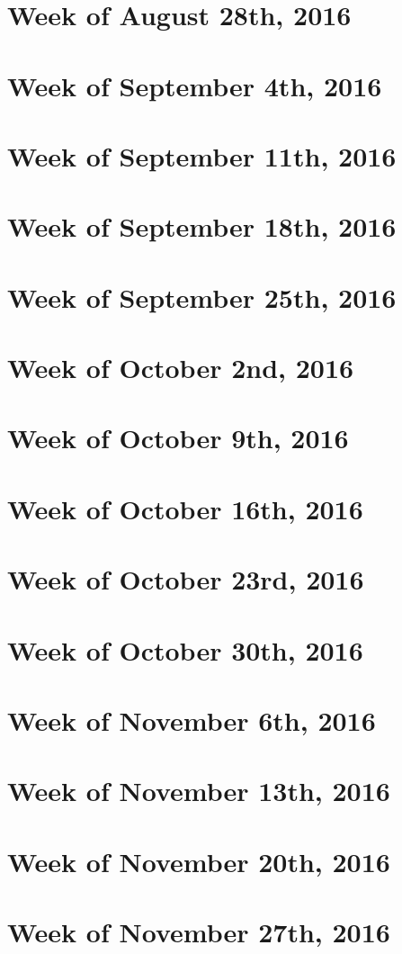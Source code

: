 \documentclass{article}
\begin{document}
\section{Week of August 28th, 2016}
\section{Week of September 4th, 2016}
\section{Week of September 11th, 2016}
\section{Week of September 18th, 2016}
\section{Week of September 25th, 2016}
\section{Week of October 2nd, 2016}
\section{Week of October 9th, 2016}
\section{Week of October 16th, 2016}
\section{Week of October 23rd, 2016}
\section{Week of October 30th, 2016}
\section{Week of November 6th, 2016}
\section{Week of November 13th, 2016}
\section{Week of November 20th, 2016}
\section{Week of November 27th, 2016}
\end{document}
